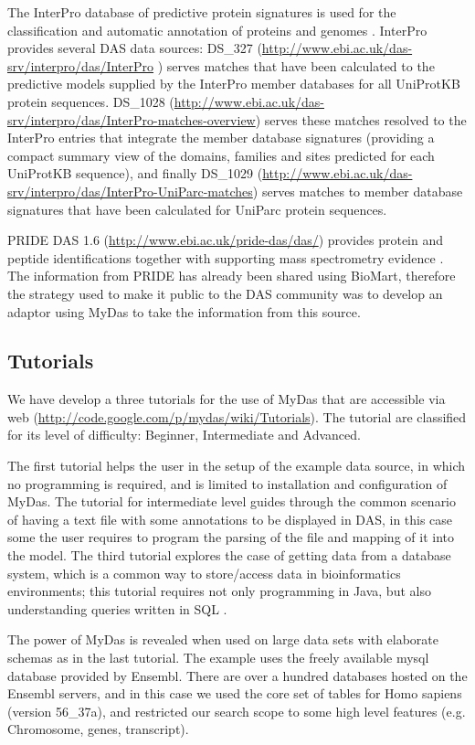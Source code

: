 The InterPro database of predictive protein signatures is used for the classification and automatic annotation of proteins and genomes \cite{HUN2009}. InterPro provides several DAS data sources: DS\_327 (\url{http://www.ebi.ac.uk/das-srv/interpro/das/InterPro} ) serves matches that have been calculated to the predictive models supplied by the InterPro member databases for all UniProtKB protein sequences.  DS\_1028 (\url{http://www.ebi.ac.uk/das-srv/interpro/das/InterPro-matches-overview}) serves these matches resolved to the InterPro entries that integrate the member database signatures (providing a compact summary view of the domains, families and sites predicted for each UniProtKB sequence), and finally DS\_1029 (\url{http://www.ebi.ac.uk/das-srv/interpro/das/InterPro-UniParc-matches}) serves matches to member database signatures that have been calculated for UniParc protein sequences.

PRIDE DAS 1.6 (\url{http://www.ebi.ac.uk/pride-das/das/}) provides protein and peptide identifications together with supporting mass spectrometry evidence \cite{VIZ2009}. The information from PRIDE has already been shared using BioMart\cite{KIN2011}, therefore the strategy used to make it public to the DAS community was to develop an adaptor using MyDas to take the information from this source.

\subsection{Tutorials}
We have develop a three tutorials for the use of MyDas that are accessible via web (\url{http://code.google.com/p/mydas/wiki/Tutorials}). The tutorial are classified for its level of difficulty: Beginner, Intermediate and Advanced. 

The first tutorial helps the user in the setup of the example data source, in which no programming is required, and is limited to installation and configuration of MyDas. The tutorial for intermediate level guides through the common scenario of having a text file with some annotations to be displayed in DAS, in this case some the user requires to program the parsing of the file and mapping of it into the model. The third tutorial explores the case of getting data from a database system, which is a common way to store/access data in bioinformatics environments; this tutorial requires not only programming in Java, but also understanding queries written in SQL .

The power of MyDas is revealed when used on large data sets with elaborate schemas as in the last tutorial. The example uses the freely available mysql database provided by Ensembl. There are over a hundred databases hosted on the Ensembl servers, and in this case we used the core set of tables for Homo sapiens (version 56\_37a), and restricted our search scope to some high level features (e.g. Chromosome, genes, transcript). 

